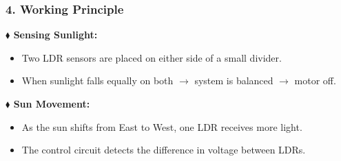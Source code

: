 \subsubsection*{4. Working Principle}
\noindent
{\fontsize{10}{14}\selectfont
\textbf{$\blacklozenge$ Sensing Sunlight:}
\begin{itemize}[leftmargin=6mm, itemsep=1mm, label=\textbullet]
  \item Two LDR sensors are placed on either side of a small divider.
  \item When sunlight falls equally on both $\rightarrow$ system is balanced $\rightarrow$ motor off.
\end{itemize}
\textbf{$\blacklozenge$ Sun Movement:}
\begin{itemize}[leftmargin=6mm, itemsep=1mm, label=\textbullet]
  \item As the sun shifts from East to West, one LDR receives more light.
  \item The control circuit detects the difference in voltage between LDRs.
\end{itemize}
}
\clearpage

